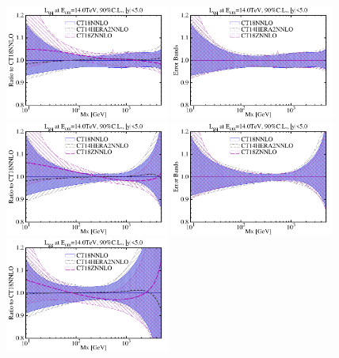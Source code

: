 \begin{widetext}
\begin{figure}[!htbp]
	\begin{center}
		\hspace*{-0.4cm}\includegraphics[width=0.48\textwidth]{./fig/qq_CT18.pdf}
		\includegraphics[width=0.48\textwidth]{./fig/qq_CT18_err.pdf} \\
		\includegraphics[width=0.48\textwidth]{./fig/gq_CT18.pdf}
		\includegraphics[width=0.48\textwidth]{./fig/gq_CT18_err.pdf} \\
		\includegraphics[width=0.48\textwidth]{./fig/gg_CT18.pdf}

\end{center}
\end{figure}
\end{widetext}
